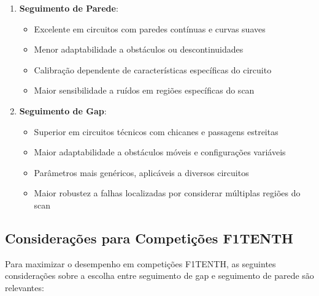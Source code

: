 \begin{enumerate}
    \item \textbf{Seguimento de Parede}:
          \begin{itemize}
              \item Excelente em circuitos com paredes contínuas e curvas suaves
              \item Menor adaptabilidade a obstáculos ou descontinuidades
              \item Calibração dependente de características específicas do circuito
              \item Maior sensibilidade a ruídos em regiões específicas do scan
          \end{itemize}

    \item \textbf{Seguimento de Gap}:
          \begin{itemize}
              \item Superior em circuitos técnicos com chicanes e passagens estreitas
              \item Maior adaptabilidade a obstáculos móveis e configurações variáveis
              \item Parâmetros mais genéricos, aplicáveis a diversos circuitos
              \item Maior robustez a falhas localizadas por considerar múltiplas regiões do scan
          \end{itemize}
\end{enumerate}

\subsection{Considerações para Competições F1TENTH}

Para maximizar o desempenho em competições F1TENTH, as seguintes considerações
sobre a escolha entre seguimento de gap e seguimento de parede são relevantes:

